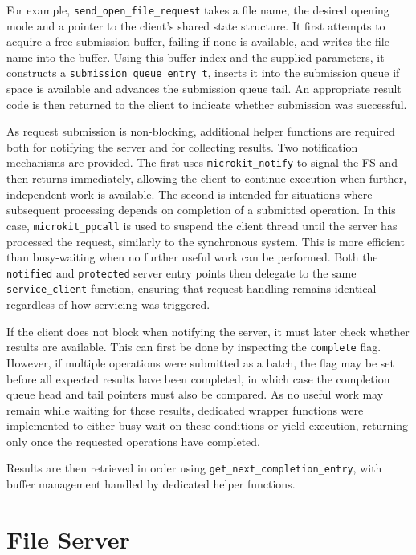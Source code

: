 For example, \texttt{send\_open\_file\_request} takes a file name, the desired opening mode and a pointer to the client’s shared state structure. It first attempts to acquire a free submission buffer, failing if none is available, and writes the file name into the buffer. Using this buffer index and the supplied parameters, it constructs a \texttt{submission\_queue\_entry\_t}, inserts it into the submission queue if space is available and advances the submission queue tail. An appropriate result code is then returned to the client to indicate whether submission was successful.

As request submission is non-blocking, additional helper functions are required both for notifying the server and for collecting results. Two notification mechanisms are provided. The first uses \texttt{microkit\_notify} to signal the FS and then returns immediately, allowing the client to continue execution when further, independent work is available. The second is intended for situations where subsequent processing depends on completion of a submitted operation. In this case, \texttt{microkit\_ppcall} is used to suspend the client thread until the server has processed the request, similarly to the synchronous system. This is more efficient than busy-waiting when no further useful work can be performed. Both the \texttt{notified} and \texttt{protected} server entry points then delegate to the same \texttt{service\_client} function, ensuring that request handling remains identical regardless of how servicing was triggered.

If the client does not block when notifying the server, it must later check whether results are available. This can first be done by inspecting the \texttt{complete} flag. However, if multiple operations were submitted as a batch, the flag may be set before all expected results have been completed, in which case the completion queue head and tail pointers must also be compared. As no useful work may remain while waiting for these results, dedicated wrapper functions were implemented to either busy-wait on these conditions or yield execution, returning only once the requested operations have completed.

Results are then retrieved in order using \texttt{get\_next\_completion\_entry}, with buffer management handled by dedicated helper functions.

\section{File Server}

